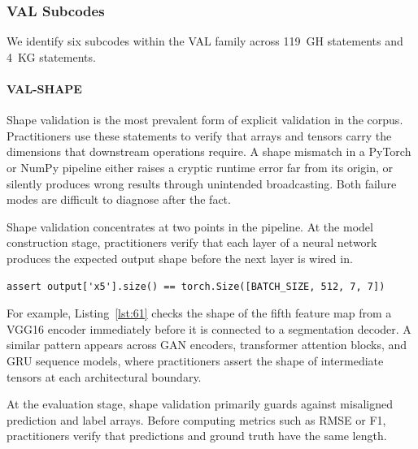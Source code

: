 
\subsubsection{VAL Subcodes}
\label{sec:val-subcodes}

We identify six subcodes within the VAL family
across 119~GH statements and 4~KG statements.


\paragraph{VAL-SHAPE}

Shape validation is the most prevalent form of explicit validation in the corpus.
Practitioners use these statements to verify
that arrays and tensors carry the dimensions that downstream operations require.
A shape mismatch in a PyTorch or NumPy pipeline
either raises a cryptic runtime error far from its origin,
or silently produces wrong results through unintended broadcasting.
Both failure modes are difficult to diagnose after the fact.

Shape validation concentrates at two points in the pipeline.
At the model construction stage,
practitioners verify that
each layer of a neural network produces the expected output shape
before the next layer is wired in.

\begin{lstlisting}[caption={}, label={lst:61}]
assert output['x5'].size() == torch.Size([BATCH_SIZE, 512, 7, 7])
\end{lstlisting}

For example, Listing~\ref{lst:61} checks the shape
of the fifth feature map from a VGG16 encoder
immediately before it is connected to a segmentation decoder.
A similar pattern appears across GAN encoders,
transformer attention blocks,
and GRU sequence models,
where practitioners assert the shape of intermediate tensors at each architectural boundary.

At the evaluation stage,
shape validation primarily guards against misaligned prediction and label arrays.
Before computing metrics such as RMSE or F1,
practitioners verify that predictions and ground truth have the same length.

